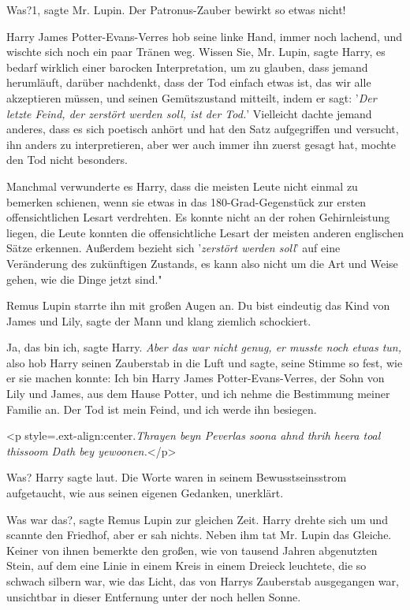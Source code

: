 \glqq Was?1\grqq{}, sagte Mr. Lupin. \glqq Der Patronus-Zauber bewirkt so etwas
nicht!\grqq{}

Harry James Potter-Evans-Verres hob seine linke Hand, immer noch lachend, und
wischte sich noch ein paar Tränen weg. \glqq Wissen Sie, Mr. Lupin\grqq{}, sagte
Harry, \glqq es bedarf wirklich einer barocken Interpretation, um zu glauben,
dass jemand herumläuft, darüber nachdenkt, dass der Tod einfach etwas ist, das
wir alle akzeptieren müssen, und seinen Gemütszustand mitteilt, indem er sagt:
'\emph{Der letzte Feind, der zerstört werden soll, ist der Tod.}' Vielleicht
dachte jemand anderes, dass es sich poetisch anhört und hat den Satz
aufgegriffen und versucht, ihn anders zu interpretieren, aber wer auch immer ihn
zuerst gesagt hat, mochte den Tod nicht besonders.\grqq{}

Manchmal verwunderte es Harry, dass die meisten Leute nicht einmal zu bemerken
schienen, wenn sie etwas in das 180-Grad-Gegenstück zur ersten offensichtlichen
Lesart verdrehten. Es konnte nicht an der rohen Gehirnleistung liegen, die Leute
konnten die offensichtliche Lesart der meisten anderen englischen Sätze
erkennen. \glqq Außerdem bezieht sich '\emph{zerstört werden soll}' auf eine
Veränderung des zukünftigen Zustands, es kann also nicht um die Art und Weise
gehen, wie die Dinge jetzt sind."

Remus Lupin starrte ihn mit großen Augen an. \glqq Du bist eindeutig das Kind
von James und Lily\grqq{}, sagte der Mann und klang ziemlich schockiert.

\glqq Ja, das bin ich\grqq{}, sagte Harry. \emph{Aber das war nicht genug, er
musste noch etwas tun,} also hob Harry seinen Zauberstab in die Luft und sagte,
seine Stimme so fest, wie er sie machen konnte: \glqq Ich bin Harry James
Potter-Evans-Verres, der Sohn von Lily und James, aus dem Hause Potter, und ich
nehme die Bestimmung meiner Familie an. Der Tod ist mein Feind, und ich werde
ihn besiegen.\grqq{}

<p style=\grqq{}.ext-align:center\grqq{}.\emph{Thrayen beyn Peverlas soona ahnd
thrih heera toal thissoom Dath bey yewoonen.}</p>

\glqq Was?\grqq{} Harry sagte laut. Die Worte waren in seinem Bewusstseinsstrom
aufgetaucht, wie aus seinen eigenen Gedanken, unerklärt.

\glqq Was war das?\grqq{}, sagte Remus Lupin zur gleichen Zeit. Harry drehte
sich um und scannte den Friedhof, aber er sah nichts. Neben ihm tat Mr. Lupin
das Gleiche. Keiner von ihnen bemerkte den großen, wie von tausend Jahren
abgenutzten Stein, auf dem eine Linie in einem Kreis in einem Dreieck leuchtete,
die so schwach silbern war, wie das Licht, das von Harrys Zauberstab ausgegangen
war, unsichtbar in dieser Entfernung unter der noch hellen Sonne.

